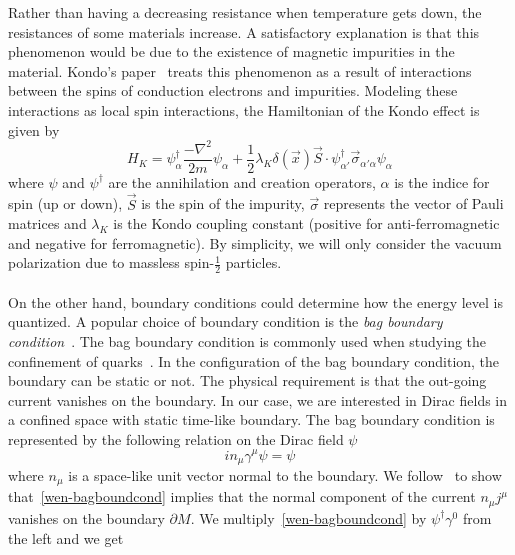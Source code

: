 Rather than having a decreasing resistance when temperature gets down,
the resistances of some materials increase. 
A satisfactory explanation is that this phenomenon would be due to the existence of magnetic impurities in the material. 
Kondo's paper~\cite{Kondo1964} treats this phenomenon as a result of interactions between the spins of conduction electrons and impurities.
Modeling these interactions as local spin interactions,
the Hamiltonian of the Kondo effect is given by~\cite{Erdmenger2013}
\begin{equation}\label{vacuum-kondohamiltonian}
H_K = \psi_\alpha^\dagger \frac{-\nabla^2}{2m}\psi_\alpha +
\frac 1 2\lambda_K \delta(\vec{x})\vec{S}\cdot \psi_{\alpha'}^\dagger  \vec{\sigma}_{\alpha' \alpha} \psi_\alpha
\end{equation}
where $\psi$ and $\psi^\dagger$ are the annihilation and creation operators, 
$\alpha$ is the indice for spin (up or down), 
$\vec{S}$ is the spin of the impurity,
$\vec{\sigma}$ represents the vector of Pauli matrices and $\lambda_K$ is the Kondo coupling constant (positive for anti-ferromagnetic and negative for ferromagnetic).
By simplicity, we will only consider the vacuum polarization due to massless spin-$\frac 1 2$ particles. \\\\
%
On the other hand, boundary conditions could determine how the energy level is quantized.
A popular choice of boundary condition is the \textit{bag boundary condition}~\cite{Chodos1974}.
The bag boundary condition is commonly used when studying the confinement of quarks~\cite{Hasenfratz1978}.
In the configuration of the bag boundary condition, the boundary can be static or not. 
The physical requirement is that the out-going current vanishes on the boundary.
In our case, we are interested in Dirac fields in a confined space with static time-like boundary.
The bag boundary condition is represented by the following relation on the Dirac field $\psi$ 
\begin{equation}\label{wen-bagboundcond}
i n_\mu\gamma^\mu \psi = \psi
\end{equation}
where $n_\mu$ is a space-like unit vector normal to the boundary.
We follow~\cite{Stokes2015} to show that~\cref{wen-bagboundcond} implies that the normal component of the current $n_\mu j^\mu$ vanishes on the boundary $\partial M$.
We multiply~\cref{wen-bagboundcond} by $\psi^\dagger\gamma^0$ from the left and we get
